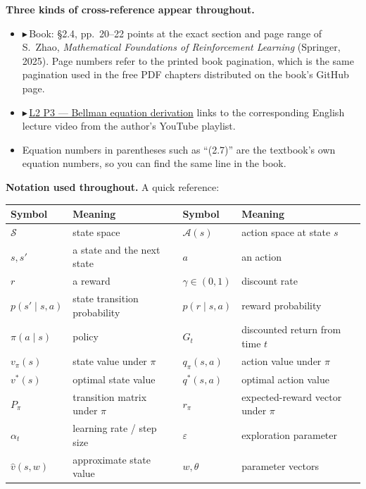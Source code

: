 \documentclass[11pt, letterpaper]{article}
\theoremstyle{runin}
\theoremstyle{runinplain}
\theoremstyle{remark}
\newcommand{\Sspace}{\mathcal{S}}
\newcommand{\Aspace}{\mathcal{A}}
\newcommand{\bk}[1]{{\color{bookblue}\small$\blacktriangleright$\,\textsf{Book: #1}}}
\newcommand{\vid}[2]{{\color{vidred}\small$\playbutton$\,\href{#2}{\textsf{#1}}}}
\newcommand{\playbutton}{\blacktriangleright}
\begin{document}
\textbf{Three kinds of cross-reference appear throughout.}

\begin{itemize}
  \item \bk{\S2.4, pp.~20--22} points at the exact section and page range of
        S.~Zhao, \emph{Mathematical Foundations of Reinforcement Learning}
        (Springer, 2025). Page numbers refer to the printed book pagination, which
        is the same pagination used in the free PDF chapters distributed on the
        book's GitHub page.
  \item \vid{L2 P3 --- Bellman equation derivation}{https://www.youtube.com/watch?v=eNtId8yPWkA}
        links to the corresponding English lecture video from the author's
        YouTube playlist.
  \item Equation numbers in parentheses such as ``(2.7)'' are the textbook's own
        equation numbers, so you can find the same line in the book.
\end{itemize}

\textbf{Notation used throughout.} A quick reference:

\begin{center}
\small
\begin{tabular}{@{}ll@{\hspace{2em}}ll@{}}
\toprule
Symbol & Meaning & Symbol & Meaning \\
\midrule
$\Sspace$ & state space & $\Aspace(s)$ & action space at state $s$ \\
$s, s'$ & a state and the next state & $a$ & an action \\
$r$ & a reward & $\gamma\in(0,1)$ & discount rate \\
$p(s'\mid s,a)$ & state transition probability & $p(r\mid s,a)$ & reward probability \\
$\pi(a\mid s)$ & policy & $G_t$ & discounted return from time $t$ \\
$v_\pi(s)$ & state value under $\pi$ & $q_\pi(s,a)$ & action value under $\pi$ \\
$v^*(s)$ & optimal state value & $q^*(s,a)$ & optimal action value \\
$P_\pi$ & transition matrix under $\pi$ & $r_\pi$ & expected-reward vector under $\pi$ \\
$\alpha_t$ & learning rate / step size & $\varepsilon$ & exploration parameter \\
$\hat v(s,w)$ & approximate state value & $w,\theta$ & parameter vectors \\
\bottomrule
\end{tabular}
\end{center}
\end{document}

